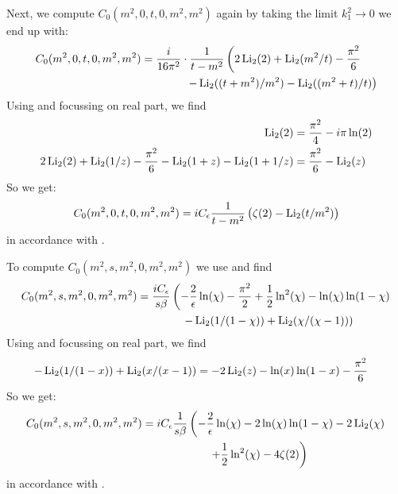 Next, we compute $C_0(m^2,0,t,0,m^2,m^2)$ again by taking the limit $k_1^2\rightarrow 0$ we end up with:
\begin{align}
C_0(m^2,0,t,0,m^2,m^2) &= \frac{i}{16\pi^2}\cdot\frac 1{t-m^2}\left(2\operatorname{\text{Li}_2}(2) + \operatorname{\text{Li}_2}(m^2/t)-\frac{\pi^2}6\right.\nonumber\\
 &\hspace{40pt}\left.-\operatorname{\text{Li}_2}((t+m^2)/m^2)-\operatorname{\text{Li}_2}((m^2+t)/t)\right)
\end{align}
Using \cite{Zagier2007} and focussing on real part, we find
\begin{align}
\operatorname{\text{Li}_2}(2) &= \frac{\pi^2}4-i\pi\ln(2)\\
2\operatorname{\text{Li}_2}(2) + \operatorname{\text{Li}_2}(1/z)-\frac{\pi^2}6-\operatorname{\text{Li}_2}(1+z)-\operatorname{\text{Li}_2}(1+1/z) &=\frac{\pi^2}6-\operatorname{\text{Li}_2}(z)
\end{align}
So we get:
\begin{equation}
C_0(m^2,0,t,0,m^2,m^2)=iC_\epsilon\frac 1{t-m^2}\left(\zeta(2)-\operatorname{\text{Li}_2}(t/m^2)\right)
\end{equation}
in accordance with \cite{Bojak:2000eu}\cite{PhysRevD.40.54}.

To compute $C_0(m^2,s,m^2,0,m^2,m^2)$ we use \cite{Bojak:2000eu} and find
\begin{align}
C_0(m^2,s,m^2,0,m^2,m^2) &= \frac{i C_\epsilon}{s\beta}\left(-\frac 2 {\epsilon} \ln(\chi)-\frac{\pi^2}2 + \frac 1 2\ln^2(\chi) - \ln(\chi)\ln(1-\chi)\right.\nonumber\\
 &\hspace{40pt}\left.-\operatorname{\text{Li}_2}(1/(1-\chi))+\operatorname{\text{Li}_2}(\chi/(\chi-1))\right)
\end{align}
Using \cite{Zagier2007} and focussing on real part, we find
\begin{align}
-\operatorname{\text{Li}_2}(1/(1-x)) + \operatorname{\text{Li}_2}(x/(x-1))&=-2\operatorname{\text{Li}_2}(z)-\ln(x)\ln(1-x)-\frac{\pi^2}6
\end{align}
So we get:
\begin{align}
C_0(m^2,s,m^2,0,m^2,m^2) &=iC_\epsilon\frac 1{s\beta}\left(-\frac 2 {\epsilon} \ln(\chi)-2\ln(\chi)\ln(1-\chi)-2\operatorname{\text{Li}_2}(\chi)\right.\nonumber\\
 &\hspace{60pt}\left.+\frac 1 2\ln^2(\chi)-4\zeta(2)\right)
\end{align}
in accordance with \cite{Bojak:2000eu}\cite{PhysRevD.40.54}.

